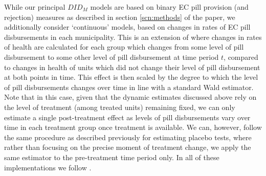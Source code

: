 \documentclass[12pt]{article}
\begin{document}
While our principal $DID_M$ models are based on binary EC pill provision (and rejection) measures as described in section  \ref{scn:methods} of the paper, we additionally consider `continuous' models, based on changes in rates of EC pill disbursements in each municipality.  This is an extension of \citet{dCdH2017} where changes in rates of health are calculated for each group which changes from some level of pill disbursement to some other level of pill disbursement at time period $t$, compared to changes in health of units which did not change their level of pill disbursement at both points in time.  This effect is then scaled by the degree to which the level of pill disbursements changes over time in line with a standard Wald estimator.  Note that in this case, given that the dynamic estimates discussed above rely on the level of treatment (among treated units) remaining fixed, we can only estimate a single post-treatment effect as levels of pill disbursements vary over time in each treatment group once treatment is available.  We can, however, follow the same procedure as described previously for estimating placebo tests, where rather than focusing on the precise moment of treatment change, we apply the same estimator to the pre-treatment time period only.  In all of these implementations we follow \citet{dCDHG2019}. 
\end{document}
